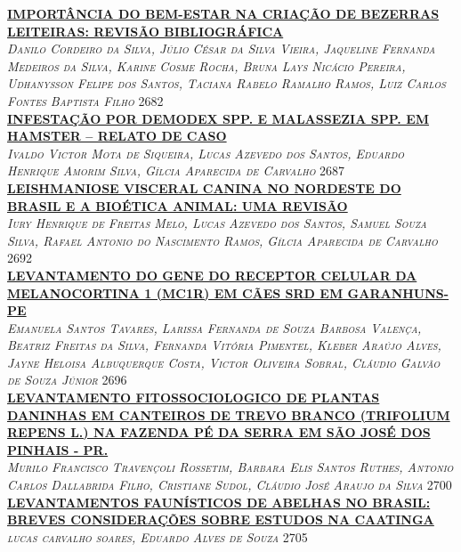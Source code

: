 \noindent \textsc{\hyperlink{trabalhos/251613.pdf.1}{\textbf{IMPORTÂNCIA DO BEM-ESTAR NA CRIAÇÃO DE BEZERRAS LEITEIRAS: REVISÃO BIBLIOGRÁFICA}}}\\ 
\noindent \textsc{\textit{Danilo Cordeiro da Silva, Júlio César da Silva Vieira, Jaqueline Fernanda Medeiros da Silva, Karine Cosme Rocha, Bruna Lays Nicácio Pereira, Udhanysson Felipe dos Santos, Taciana Rabelo Ramalho Ramos, Luiz Carlos Fontes Baptista Filho}} \hfill 2682\\ 

\noindent \textsc{\hyperlink{trabalhos/249204.pdf.1}{\textbf{INFESTAÇÃO POR DEMODEX SPP. E MALASSEZIA SPP. EM HAMSTER – RELATO DE CASO}}}\\ 
\noindent \textsc{\textit{Ivaldo Victor Mota de Siqueira, Lucas Azevedo dos Santos, Eduardo Henrique Amorim Silva, Gílcia Aparecida de Carvalho}} \hfill 2687\\ 

\noindent \textsc{\hyperlink{trabalhos/251581.pdf.1}{\textbf{LEISHMANIOSE VISCERAL CANINA NO NORDESTE DO BRASIL E A BIOÉTICA ANIMAL: UMA REVISÃO}}}\\ 
\noindent \textsc{\textit{Iury Henrique de Freitas Melo, Lucas Azevedo dos Santos, Samuel Souza Silva, Rafael Antonio do Nascimento Ramos, Gílcia Aparecida de Carvalho}} \hfill 2692\\ 

\noindent \textsc{\hyperlink{trabalhos/251739.pdf.1}{\textbf{LEVANTAMENTO DO GENE DO RECEPTOR CELULAR DA MELANOCORTINA 1 (MC1R) EM CÃES SRD EM GARANHUNS-PE}}}\\ 
\noindent \textsc{\textit{Emanuela Santos Tavares, Larissa Fernanda de Souza Barbosa Valença, Beatriz Freitas da Silva, Fernanda Vitória Pimentel, Kleber Araújo Alves, Jayne Heloisa Albuquerque Costa, Victor Oliveira Sobral, Cláudio Galvão de Souza Júnior}} \hfill 2696\\ 

\noindent \textsc{\hyperlink{trabalhos/250321.pdf.1}{\textbf{LEVANTAMENTO FITOSSOCIOLOGICO DE PLANTAS DANINHAS EM CANTEIROS DE TREVO BRANCO (TRIFOLIUM REPENS L.) NA FAZENDA PÉ DA SERRA EM SÃO JOSÉ DOS PINHAIS - PR.}}}\\ 
\noindent \textsc{\textit{Murilo Francisco Travençoli Rossetim, Barbara Elis Santos Ruthes, Antonio Carlos Dallabrida Filho, Cristiane Sudol, Cláudio José Araujo da Silva}} \hfill 2700\\ 

\noindent \textsc{\hyperlink{trabalhos/251469.pdf.1}{\textbf{LEVANTAMENTOS FAUNÍSTICOS DE ABELHAS NO BRASIL: BREVES CONSIDERAÇÕES SOBRE ESTUDOS NA CAATINGA}}}\\ 
\noindent \textsc{\textit{lucas carvalho soares, Eduardo Alves de Souza}} \hfill 2705\\ 

